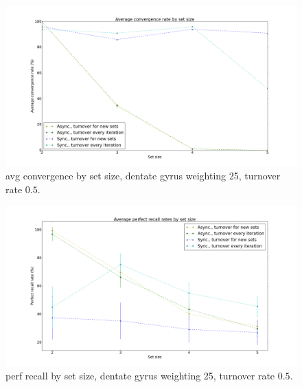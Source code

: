 
\begin{figure}[h!]
    \centering
    \includegraphics[width=14cm]{fig/avg_convergence_rate.png}
    \caption{avg convergence by set size, dentate gyrus weighting 25, turnover rate $0.5$.}
    \label{fig:avg_convergence_rate}
\end{figure}

\begin{figure}[h!]
    \centering
    \includegraphics[width=14cm]{fig/avg_perfect_recall_rates.png}
    \caption{perf recall by set size, dentate gyrus weighting 25, turnover rate $0.5$.}
    \label{fig:avg_perfect_recall_rates}
\end{figure}

